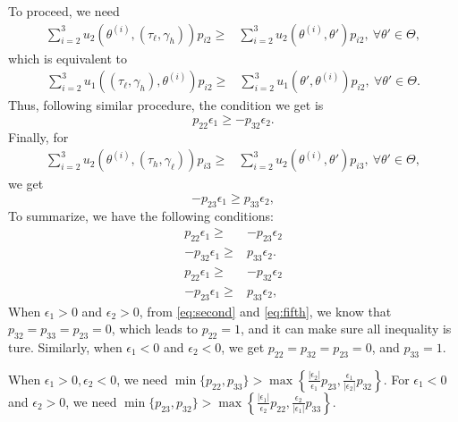 To proceed, we need 
\begin{equation*}
    \begin{split}
     \sum_{i=2}^3 u_2\left(\theta^{(i)},(\tau_{\ell},\gamma_{h})\right)p_{i2} \geq {} &    \sum_{i=2}^3 u_2\left(\theta^{(i)},\theta'\right)p_{i2},\ \forall \theta'\in\Theta, 
    \end{split}
\end{equation*}
which is equivalent to 
\begin{equation*}
    \begin{split}
     \sum_{i=2}^3 u_1\left((\tau_{\ell},\gamma_{h}),\theta^{(i)}\right)p_{i2} \geq {} &    \sum_{i=2}^3 u_1\left(\theta',\theta^{(i)}\right)p_{i2},\ \forall \theta'\in\Theta. 
    \end{split}
\end{equation*}
Thus, following similar procedure, the condition we get is 
$$ p_{22}\epsilon_1\geq -p_{32}\epsilon_2. $$
Finally, for 
\begin{equation*}
    \begin{split}
     \sum_{i=2}^3 u_2\left(\theta^{(i)},(\tau_{h},\gamma_{\ell})\right)p_{i3} \geq {} &    \sum_{i=2}^3 u_2\left(\theta^{(i)},\theta'\right)p_{i3},\ \forall \theta'\in\Theta, 
    \end{split}
\end{equation*}
we get 
$$ -p_{23}\epsilon_1\geq p_{33}\epsilon_2,$$
To summarize, we have the following conditions:
\begin{align}
        p_{22}\epsilon_1 \geq {} & -p_{23}\epsilon_2 \label{eq:first}\\
        -p_{32}\epsilon_1\geq {} & p_{33}\epsilon_2 \label{eq:second}.\\
        p_{22}\epsilon_1\geq {} & -p_{32}\epsilon_2 \label{eq:fourth}\\
         -p_{23}\epsilon_1\geq {} & p_{33}\epsilon_2 \label{eq:fifth},
\end{align}
When $\epsilon_1>0$ and $\epsilon_2>0$, from \eqref{eq:second} and \eqref{eq:fifth}, we know that $p_{32}=p_{33}=p_{23}=0$, which leads to $p_{22}=1$, and it can make sure all inequality is ture. Similarly,  when $\epsilon_1<0$ and $\epsilon_2<0$, we get $p_{22}=p_{32}=p_{23}=0$, and $p_{33}=1$.

When $\epsilon_1>0,\epsilon_2<0$,  we need $\min\{p_{22},p_{33}\}>\max\left\{ \frac{|\epsilon_2|}{\epsilon_1}p_{23}, \frac{\epsilon_1}{|\epsilon_2|}p_{32} \right\}$. For  $\epsilon_1<0$ and $\epsilon_2>0$, we need $\min\{p_{23},p_{32}\}>\max\left\{ \frac{|\epsilon_1|}{\epsilon_2}p_{22}, \frac{\epsilon_2}{|\epsilon_1|}p_{33} \right\}$. 
